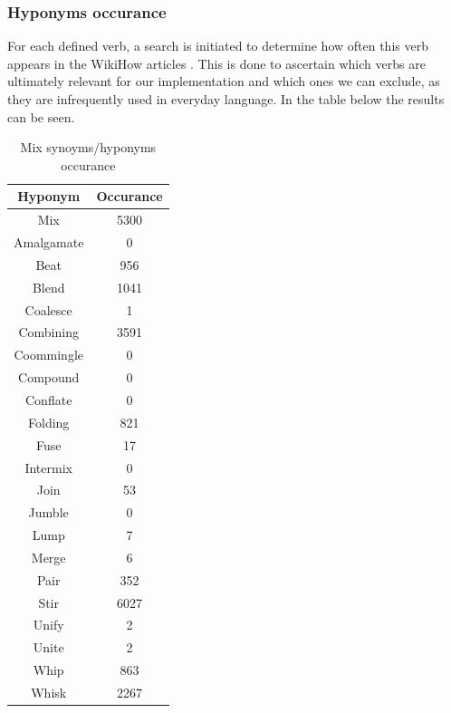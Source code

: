    \subsubsection*{Hyponyms occurance}
    For each defined verb, a search is initiated to determine how often this verb appears in the WikiHow articles \cite{wikihow}. This is done to ascertain which verbs are ultimately relevant for our implementation and which ones we can exclude, as they are infrequently used in everyday language.
    In the table below the results can be seen.
    \begin{table}[H]
        \centering
        \begin{tabular}{|c|c|}
          \hline
          \textbf{Hyponym} & \textbf{Occurance}  \\
          \hline
          Mix & 5300 \\
          \hline
          Amalgamate & 0 \\
          \hline
          Beat & 956 \\
          \hline
          Blend & 1041 \\
          \hline
          Coalesce & 1 \\
          \hline
          Combining & 3591  \\
          \hline
          Coommingle & 0 \\
          \hline
          Compound & 0 \\
          \hline
          Conflate & 0 \\
          \hline
          Folding & 821 \\
          \hline
          Fuse & 17 \\
          \hline
          Intermix & 0 \\
          \hline
          Join & 53 \\
          \hline
          Jumble & 0 \\
          \hline
          Lump & 7 \\
          \hline
          Merge & 6 \\
          \hline
          Pair & 352 \\
          \hline
          Stir & 6027 \\
          \hline
          Unify & 2 \\
          \hline
          Unite & 2 \\
          \hline
          Whip & 863 \\
          \hline
          Whisk & 2267 \\
          \hline
          
    
        \end{tabular}
        \caption{Mix synoyms/hyponyms occurance}
        \label{tab:hyponyms}
      \end{table}
      
